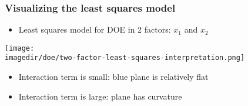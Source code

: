\begin{frame}\frametitle{Visualizing the least squares model}
	\begin{itemize}
		\item	Least squares model for DOE in 2 factors: $x_1$ and $x_2$
	\end{itemize}
	\begin{center}
		\texttt{[image: \\imagedir/doe/two-factor-least-squares-interpretation.png]}
	\end{center}
	\begin{itemize}
		\item	Interaction term is small: blue plane is relatively flat
		\item	Interaction term is large: plane has curvature
	\end{itemize}
\end{frame}

